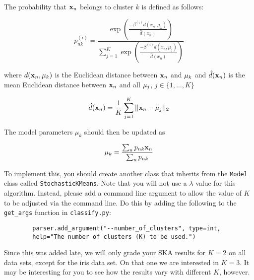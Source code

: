 \documentclass[11pt]{article}
\newcommand{\vxn}{{\bf x}_n}
\newcommand{\vmu}{{\bf \mu}}
\newcommand{\vmuk}{{\bf \mu}_k}
\newcommand{\vmuj}{{\bf \mu}_j}
\newcommand{\code}[1]{{\footnotesize \tt #1}}
\begin{document}
\noindent The probability that $\vxn$ belongs to cluster $k$ is defined as follows:

\begin{equation}
\label{eq:E5}
p_{nk}^{(i)} =  \frac{\exp\left(\frac{-\beta^{(i)}d(x_n,\mu_k)}{\hat{d}(x_n)}\right)}{\sum_{j=1}^{K} \exp\left(\frac{-\beta^{(i)}d(x_n,\mu_j)}{\hat{d}(x_n)}\right) }
\end{equation}

\noindent where $d(\vxn,\vmuk)$ is the Euclidean distance between $\vxn$ and $\vmuk$ and $\hat{d}(\vxn)$ is the mean Euclidean distance between $\vxn$ and all $\vmuj$, $j\in \{1,\ldots,K\}$

\begin{equation}
\hat{d}(\vxn)= \frac{1}{K}\sum_{j=1}^{K}\vert\vert \vxn - \vmuj \vert\vert_2
\end{equation}

\noindent The model parameters $\mu_k$ should then be updated as

\begin{equation}
\vmu_{k}= \frac{\sum_n p_{nk} \vxn}{\sum_n p_{nk}}
\end{equation}

\noindent To implement this, you should create another class that inherits from the \code{Model} class called \code{StochasticKMeans}.  Note that you will not use a $\lambda$ value for this algorithm.  Instead, please add a command line argument to allow the value of $K$ to be adjusted via the command line.  Do this by adding the following to the \code{get\_args} function in \code{classify.py}:
	\begin{footnotesize}
		\begin{verbatim}
		parser.add_argument("--number_of_clusters", type=int, 
		help="The number of clusters (K) to be used.")
		\end{verbatim}
	\end{footnotesize}
	
\noindent * Since this was added late, we will only grade your SKA results for $K=2$ on all data sets, except for the iris data set.  On that one we are interested in $K=3$.  It may be interesting for you to see how the results vary with different $K$, however.

\end{document}
